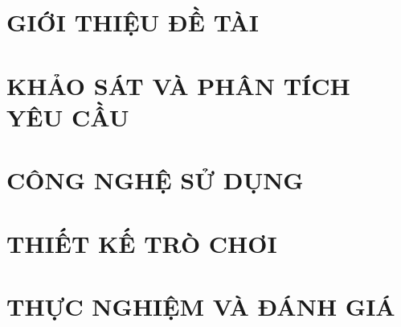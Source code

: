 \documentclass[a4paper,13pt,3p,twoside]{report}
\theoremstyle{definition}
\begin{document}
\glsaddall 
 \renewcommand*{\glossaryname}{Danh sách thuật ngữ}
\renewcommand*{\acronymname}{DANH MỤC THUẬT NGỮ VÀ TỪ VIẾT TẮT}
\renewcommand*{\entryname}{Thuật ngữ}
\renewcommand*{\descriptionname}{Ý nghĩa}
\printnoidxglossaries


% 


\newpage
{}

\pagestyle{fancy}
\fancyhf{}
\fancyhead[RE, LO]{\leftmark}
\fancyfoot[RE, LO]{\thepage}

\chapter{GIỚI THIỆU ĐỀ TÀI}
\label{chapter:Introduction}

\newpage
\chapter{KHẢO SÁT VÀ PHÂN TÍCH YÊU CẦU}
\label{chapter:Related_works}



\newpage
\chapter{CÔNG NGHỆ SỬ DỤNG}
\label{chapter:Methodology}


\newpage
\chapter{THIẾT KẾ TRÒ CHƠI}
\label{chapter:GameDesign}


\newpage
\chapter{THỰC NGHIỆM VÀ ĐÁNH GIÁ}
\label{chapter:Experiment}


\newpage
\end{document}
